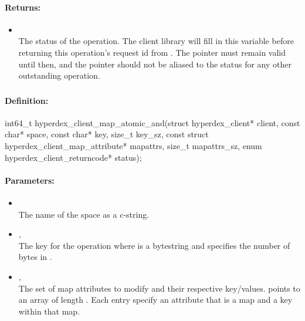 \paragraph{Returns:}
\begin{itemize}[noitemsep]
\item {}\\
The status of the operation.  The client library will fill in this variable before returning this operation's request id from .  The pointer must remain valid until then, and the pointer should not be aliased to the status for any other outstanding operation.
\end{itemize}

\pagebreak
\subsubsection{}
\label{api:c:map_atomic_and}


\paragraph{Definition:}
\begin{ccode}
int64_t hyperdex_client_map_atomic_and(struct hyperdex_client* client,
        const char* space,
        const char* key, size_t key_sz,
        const struct hyperdex_client_map_attribute* mapattrs, size_t mapattrs_sz,
        enum hyperdex_client_returncode* status);
\end{ccode}

\paragraph{Parameters:}
\begin{itemize}[noitemsep]
\item {}\\
The name of the space as a c-string.
\item {}, \\
The key for the operation where  is a bytestring and  specifies the number of bytes in .
\item {}, \\
The set of map attributes to modify and their respective key/values.   points to an array of length .  Each entry specify an attribute that is a map and a key within that map.
\end{itemize}

